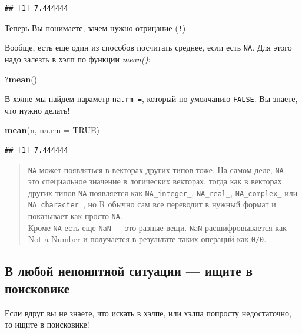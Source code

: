 \documentclass[
]{book}
\newenvironment{Shaded}{\begin{snugshade}}{\end{snugshade}}
\newcommand{\DataTypeTok}[1]{\textcolor[rgb]{0.13,0.29,0.53}{#1}}
\newcommand{\KeywordTok}[1]{\textcolor[rgb]{0.13,0.29,0.53}{\textbf{#1}}}
\newcommand{\NormalTok}[1]{#1}
\newcommand{\OtherTok}[1]{\textcolor[rgb]{0.56,0.35,0.01}{#1}}
\begin{document}
\begin{verbatim}
## [1] 7.444444
\end{verbatim}

Теперь Вы понимаете, зачем нужно отрицание (\texttt{!})

Вообще, есть еще один из способов посчитать среднее, если есть \texttt{NA}. Для этого надо залезть в хэлп по функции \emph{mean()}:

\begin{Shaded}
\begin{Highlighting}[]
\NormalTok{?}\KeywordTok{mean}\NormalTok{()}
\end{Highlighting}
\end{Shaded}

В хэлпе мы найдем параметр \texttt{na.rm\ =}, который по умолчанию \texttt{FALSE}. Вы знаете, что нужно делать!

\begin{Shaded}
\begin{Highlighting}[]
\KeywordTok{mean}\NormalTok{(n, }\DataTypeTok{na.rm =} \OtherTok{TRUE}\NormalTok{)}
\end{Highlighting}
\end{Shaded}

\begin{verbatim}
## [1] 7.444444
\end{verbatim}

\begin{quote}
\texttt{NA} может появляться в векторах других типов тоже. На самом деле, \texttt{NA} - это специальное значение в логических векторах, тогда как в векторах других типов \texttt{NA} появляется как \texttt{NA\_integer\_}, \texttt{NA\_real\_}, \texttt{NA\_complex\_} или \texttt{NA\_character\_}, но R обычно сам все переводит в нужный формат и показывает как просто \texttt{NA}.\\
Кроме \texttt{NA} есть еще \texttt{NaN} --- это разные вещи. \texttt{NaN} расшифровывается как Not a Number и получается в результате таких операций как \texttt{0/0}.
\end{quote}

\hypertarget{google}{%
\subsection{В любой непонятной ситуации --- ищите в поисковике}\label{google}}

Если вдруг вы не знаете, что искать в хэлпе, или хэлпа попросту недостаточно, то ищите в поисковике!
\end{document}
